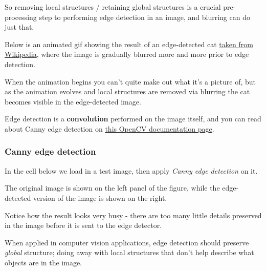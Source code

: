\documentclass[11pt]{article}
\begin{document}
So removing local structures / retaining global structures is a crucial
pre-processing step to performing edge detection in an image, and
blurring can do just that.

Below is an animated gif showing the result of an edge-detected cat
\href{https://en.wikipedia.org/wiki/Gaussian_blur\#Common_uses}{taken
from Wikipedia}, where the image is gradually blurred more and more
prior to edge detection.

When the animation begins you can't quite make out what it's a picture
of, but as the animation evolves and local structures are removed via
blurring the cat becomes visible in the edge-detected image.

Edge detection is a \textbf{convolution} performed on the image itself,
and you can read about Canny edge detection on
\href{http://docs.opencv.org/2.4/doc/tutorials/imgproc/imgtrans/canny_detector/canny_detector.html}{this
OpenCV documentation page}.

    \subsubsection{Canny edge detection}\label{canny-edge-detection}

In the cell below we load in a test image, then apply \emph{Canny edge
detection} on it.

The original image is shown on the left panel of the figure, while the
edge-detected version of the image is shown on the right.

Notice how the result looks very busy - there are too many little
details preserved in the image before it is sent to the edge detector.

When applied in computer vision applications, edge detection should
preserve \emph{global} structure; doing away with local structures that
don't help describe what objects are in the image.
\end{document}

